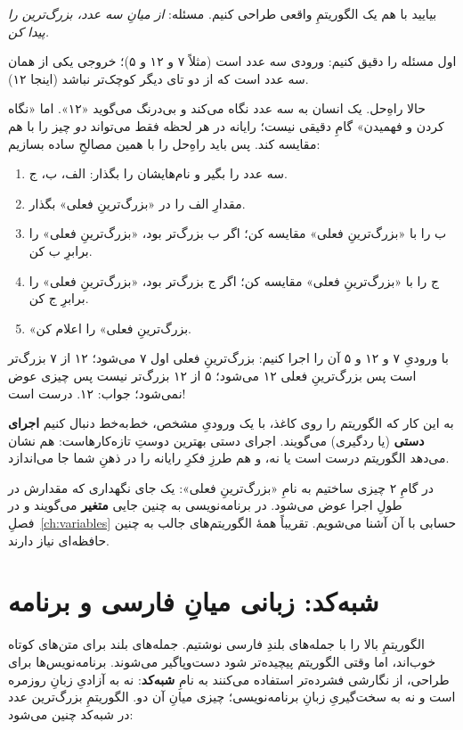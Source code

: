 بیایید با هم یک الگوریتمِ واقعی طراحی کنیم. مسئله: \emph{از میانِ سه عدد،
بزرگ‌ترین را پیدا کن.}

اول مسئله را دقیق کنیم: ورودی سه عدد است (مثلاً ۷ و ۱۲ و ۵)؛ خروجی یکی از
همان سه عدد است که از دو تای دیگر کوچک‌تر نباشد (اینجا ۱۲).

حالا راهِ‌حل. یک انسان به سه عدد نگاه می‌کند و بی‌درنگ می‌گوید «۱۲». اما
«نگاه کردن و فهمیدن» گامِ دقیقی نیست؛ رایانه در هر لحظه فقط می‌تواند
\emph{دو} چیز را با هم مقایسه کند. پس باید راهِ‌حل را با همین مصالحِ ساده
بسازیم:

\begin{enumerate}
  \item سه عدد را بگیر و نام‌هایشان را بگذار: الف، ب، ج.
  \item مقدارِ الف را در «بزرگ‌ترینِ فعلی» بگذار.
  \item ب را با «بزرگ‌ترینِ فعلی» مقایسه کن؛ اگر ب بزرگ‌تر بود،
        «بزرگ‌ترینِ فعلی» را برابرِ ب کن.
  \item ج را با «بزرگ‌ترینِ فعلی» مقایسه کن؛ اگر ج بزرگ‌تر بود،
        «بزرگ‌ترینِ فعلی» را برابرِ ج کن.
  \item «بزرگ‌ترینِ فعلی» را اعلام کن.
\end{enumerate}

با ورودیِ ۷ و ۱۲ و ۵ آن را اجرا کنیم: بزرگ‌ترینِ فعلی اول ۷ می‌شود؛ ۱۲ از ۷
بزرگ‌تر است پس بزرگ‌ترینِ فعلی ۱۲ می‌شود؛ ۵ از ۱۲ بزرگ‌تر نیست پس چیزی عوض
نمی‌شود؛ جواب: ۱۲. درست است!

به این کار که الگوریتم را روی کاغذ، با یک ورودیِ مشخص، خط‌به‌خط دنبال کنیم
\textbf{اجرای دستی} (یا ردگیری) می‌گویند. اجرای دستی بهترین دوستِ
تازه‌کارهاست: هم نشان می‌دهد الگوریتم درست است یا نه، و هم طرزِ فکرِ رایانه
را در ذهنِ شما جا می‌اندازد.

\begin{tip}
در گامِ ۲ چیزی ساختیم به نامِ «بزرگ‌ترینِ فعلی»: یک جای نگهداری که مقدارش
در طولِ اجرا عوض می‌شود. در برنامه‌نویسی به چنین جایی \textbf{متغیر}
می‌گویند و در فصلِ~\ref{ch:variables} حسابی با آن آشنا می‌شویم. تقریباً همهٔ
الگوریتم‌های جالب به چنین حافظه‌ای نیاز دارند.
\end{tip}

\section{شبه‌کد: زبانی میانِ فارسی و برنامه}

الگوریتمِ بالا را با جمله‌های بلندِ فارسی نوشتیم. جمله‌های بلند برای متن‌های
کوتاه خوب‌اند، اما وقتی الگوریتم پیچیده‌تر شود دست‌وپاگیر می‌شوند.
برنامه‌نویس‌ها برای طراحی، از نگارشی فشرده‌تر استفاده می‌کنند به نامِ
\textbf{شبه‌کد}: نه به آزادیِ زبانِ روزمره است و نه به سخت‌گیریِ زبانِ
برنامه‌نویسی؛ چیزی میانِ آن دو. الگوریتمِ بزرگ‌ترین عدد در شبه‌کد چنین
می‌شود:

